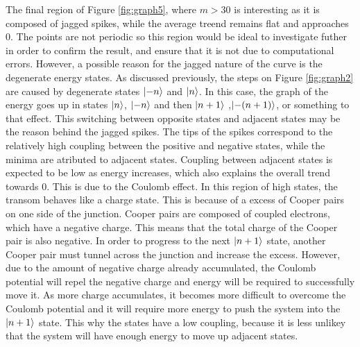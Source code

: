 \documentclass[11pt]{article}
\begin{document}
The final region of Figure \ref{fig:graph5}, where $m>30$ is interesting as it is composed of jagged spikes, while the average treend remains flat and approaches 0. The points are not periodic so this region would be ideal to investigate futher in order to confirm the result, and ensure that it is not due to computational errors. However, a possible reason for the jagged nature of the curve is the degenerate energy states. As discussed previously, the steps on Figure \ref{fig:graph2} are caused by degenerate states $\ket{-n}$ and $\ket{n}$. In this case, the graph of the energy  goes up in states  $\ket{n}$, $\ket{-n}$ and then $\ket{n+1}$ ,$\ket{-(n+1)}$, or something to that effect. This switching between opposite states and adjacent states may be the reason behind the jagged spikes. The tips of the spikes correspond to the relatively high coupling between the positive and negative states, while the minima are atributed to adjacent states. Coupling between adjacent states is expected to be low as energy increases, which also explains the overall trend towards 0. This is due to the Coulomb effect. In this region of high states, the transom behaves like a charge state. This is because of a excess of Cooper pairs on one side of the junction. Cooper pairs are composed of coupled electrons, which have a negative charge. This means that the total charge of the Cooper pair is also negative. In order to progress to the next  $\ket{n+1}$ state, another Cooper pair must tunnel across the junction and increase the excess. However, due to the amount of negative charge already accumulated, the Coulomb potential will repel the negative charge and energy will be required to successfully move it. As more charge accumulates, it becomes more difficult to overcome the Coulomb potential and it will require more energy to push the system into the  $\ket{n+1}$ state. This why the states have a low coupling, because it is less unlikey that the system will have enough energy to move up adjacent states.
\end{document}
